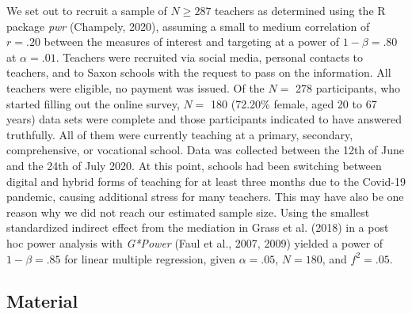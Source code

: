 \documentclass[
  english,
  man,floatsintext]{apa6}
\begin{document}
We set out to recruit a sample of \(N\ge287\) teachers as determined using the R package \emph{pwr} (Champely, 2020), assuming a small to medium correlation of \(r=.20\) between the measures of interest and targeting at a power of \(1-\beta=.80\) at \(\alpha=.01\).
Teachers were recruited via social media, personal contacts to teachers, and to Saxon schools with the request to pass on the information.
All teachers were eligible, no payment was issued.
Of the \(N=\) 278 participants, who started filling out the online survey, \(N =\) 180 (72.20\% female, aged 20 to 67 years) data sets were complete and those participants indicated to have answered truthfully.
All of them were currently teaching at a primary, secondary, comprehensive, or vocational school.
Data was collected between the 12th of June and the 24th of July 2020.
At this point, schools had been switching between digital and hybrid forms of teaching for at least three months due to the Covid-19 pandemic, causing additional stress for many teachers.
This may have also be one reason why we did not reach our estimated sample size.
Using the smallest standardized indirect effect from the mediation in Grass et al. (2018) in a post hoc power analysis with \emph{G*Power} (Faul et al., 2007, 2009) yielded a power of \(1-\beta=.85\) for linear multiple regression, given \(\alpha=.05\), \(N=180\), and \(f^2=.05\).

\hypertarget{material}{%
\subsection{Material}\label{material}}
\end{document}
